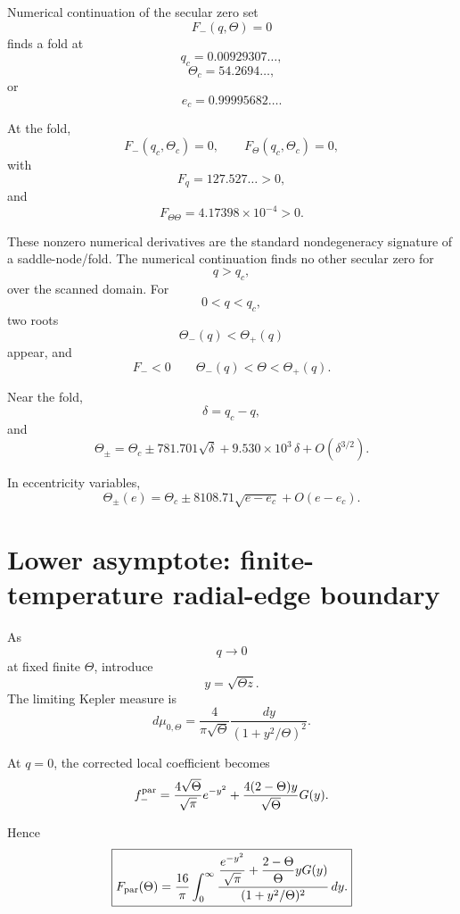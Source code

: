 \documentclass[11pt]{article}
\theoremstyle{remark}
\newcommand{\1}{\mathbf 1}
\begin{document}
Numerical continuation of the secular zero set
\[
F_-(q,\Theta)=0
\]
finds a fold at
\begin{equation}
\boxed{
q_c
=
0.00929307\ldots,
}
\end{equation}
\begin{equation}
\boxed{
\Theta_c
=
54.2694\ldots,
}
\end{equation}
or
\begin{equation}
\boxed{
e_c
=
0.99995682\ldots.
}
\end{equation}

At the fold,
\[
F_-(q_c,\Theta_c)=0,
\qquad
F_\Theta(q_c,\Theta_c)=0,
\]
with
\[
F_q
=
127.527\ldots>0,
\]
and
\[
F_{\Theta\Theta}
=
4.17398\times10^{-4}>0.
\]

These nonzero numerical derivatives are the standard nondegeneracy
signature of a saddle-node/fold.  The numerical continuation finds no other
secular zero for
\[
q>q_c,
\]
over the scanned domain.  For
\[
0<q<q_c,
\]
two roots
\[
\Theta_-(q)<\Theta_+(q)
\]
appear, and
\begin{equation}
\boxed{
F_-<0
\qquad
\Theta_-(q)<\Theta<\Theta_+(q).
}
\label{eq:negativeband}
\end{equation}

Near the fold,
\[
\delta=q_c-q,
\]
and
\begin{equation}
\boxed{
\Theta_\pm
=
\Theta_c
\pm
781.701\sqrt{\delta}
+
9.530\times10^3\,\delta
+
O(\delta^{3/2}).
}
\label{eq:foldbranches}
\end{equation}

In eccentricity variables,
\[
\boxed{
\Theta_\pm(e)
=
\Theta_c
\pm
8108.71\sqrt{e-e_c}
+
O(e-e_c).
}
\]

\section{Lower asymptote: finite-temperature radial-edge boundary}

As
\[
q\to0
\]
at fixed finite $\Theta$, introduce
\[
y=\sqrt{\Theta z}.
\]
The limiting Kepler measure is
\[
d\mu_{0,\Theta}
=
\frac{4}{\pi\sqrt\Theta}
\frac{dy}{(1+y^2/\Theta)^2}.
\]

At $q=0$, the corrected local coefficient becomes
\[
f_-^{\rm par}
=
\frac{4\sqrt\Theta}{\sqrt\pi}e^{-y^2}
+
\frac{4(2-\Theta)y}{\sqrt\Theta}G(y).
\]

Hence
\begin{equation}
\boxed{
F_{\rm par}(\Theta)
=
\frac{16}{\pi}
\int_0^\infty
\frac{
\dfrac{e^{-y^2}}{\sqrt\pi}
+
\dfrac{2-\Theta}{\Theta}yG(y)
}{
(1+y^2/\Theta)^2
}\,dy.
}
\label{eq:Fpar}
\end{equation}
\end{document}
